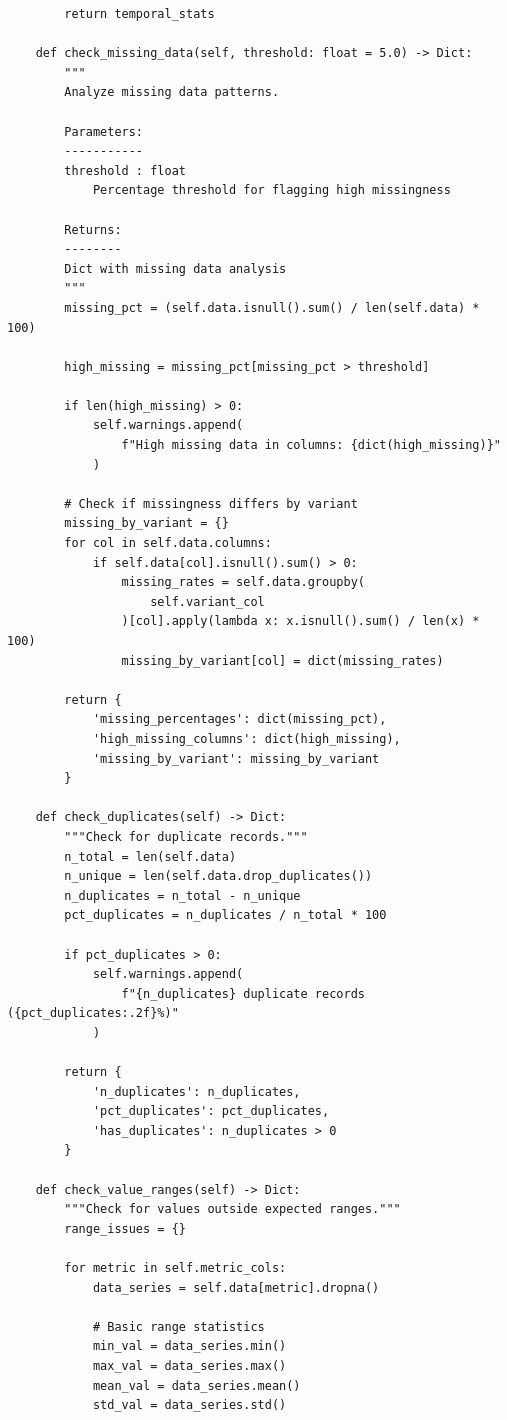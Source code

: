 \begin{lstlisting}
        return temporal_stats

    def check_missing_data(self, threshold: float = 5.0) -> Dict:
        """
        Analyze missing data patterns.

        Parameters:
        -----------
        threshold : float
            Percentage threshold for flagging high missingness

        Returns:
        --------
        Dict with missing data analysis
        """
        missing_pct = (self.data.isnull().sum() / len(self.data) * 100)

        high_missing = missing_pct[missing_pct > threshold]

        if len(high_missing) > 0:
            self.warnings.append(
                f"High missing data in columns: {dict(high_missing)}"
            )

        # Check if missingness differs by variant
        missing_by_variant = {}
        for col in self.data.columns:
            if self.data[col].isnull().sum() > 0:
                missing_rates = self.data.groupby(
                    self.variant_col
                )[col].apply(lambda x: x.isnull().sum() / len(x) * 100)
                missing_by_variant[col] = dict(missing_rates)

        return {
            'missing_percentages': dict(missing_pct),
            'high_missing_columns': dict(high_missing),
            'missing_by_variant': missing_by_variant
        }

    def check_duplicates(self) -> Dict:
        """Check for duplicate records."""
        n_total = len(self.data)
        n_unique = len(self.data.drop_duplicates())
        n_duplicates = n_total - n_unique
        pct_duplicates = n_duplicates / n_total * 100

        if pct_duplicates > 0:
            self.warnings.append(
                f"{n_duplicates} duplicate records ({pct_duplicates:.2f}%)"
            )

        return {
            'n_duplicates': n_duplicates,
            'pct_duplicates': pct_duplicates,
            'has_duplicates': n_duplicates > 0
        }

    def check_value_ranges(self) -> Dict:
        """Check for values outside expected ranges."""
        range_issues = {}

        for metric in self.metric_cols:
            data_series = self.data[metric].dropna()

            # Basic range statistics
            min_val = data_series.min()
            max_val = data_series.max()
            mean_val = data_series.mean()
            std_val = data_series.std()


\end{lstlisting}
